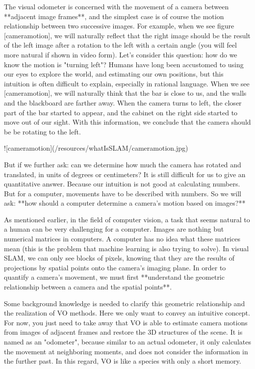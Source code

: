 The visual odometer is concerned with the movement of a camera between **adjacent image frames**, and the simplest case is of course the motion relationship between two successive images. For example, when we see figure [cameramotion], we will naturally reflect that the right image should be the result of the left image after a rotation to the left with a certain angle (you will feel more natural if shown in video form). Let's consider this question: how do we know the motion is "turning left"? Humans have long been accustomed to using our eyes to explore the world, and estimating our own positions, but this intuition is often difficult to explain, especially in rational language. When we see [cameramotion], we will naturally think that the bar is close to us, and the walls and the blackboard are farther away. When the camera turns to left, the closer part of the bar started to appear, and the cabinet on the right side started to move out of our sight. With this information, we conclude that the camera should be be rotating to the left.

![cameramotion](/resources/whatIsSLAM/cameramotion.jpg)

But if we further ask: can we determine how much the camera has rotated and translated, in units of degrees or centimeters? It is still difficult for us to give an quantitative answer. Because our intuition is not good at calculating numbers. But for a computer, movements have to be described with numbers. So we will ask: **how should a computer determine a camera's motion based on images?**

As mentioned earlier, in the field of computer vision, a task that seems natural to a human can be very challenging for a computer. Images are nothing but numerical matrices in computers. A computer has no idea what these matrices mean (this is the problem that machine learning is also trying to solve). In visual SLAM, we can only see blocks of pixels, knowing that they are the results of projections by spatial points onto the camera's imaging plane. In order to quantify a camera's movement, we must first **understand the geometric relationship between a camera and the spatial points**.

Some background knowledge is needed to clarify this geometric relationship and the realization of VO methods. Here we only want to convey an intuitive concept. For now, you just need to take away that VO is able to estimate camera motions from images of adjacent frames and restore the 3D structures of the scene. It is named as an "odometer", because similar to an actual odometer, it only calculates the movement at neighboring moments, and does not consider the information in the further past. In this regard, VO is like a species with only a short memory.

